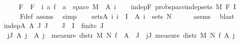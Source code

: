 \begin{isabellebody}
%
\isadelimproof
%
\endisadelimproof
%
\isatagproof
{}\isamarkupfalse%
\ {\isacharminus}{\kern0pt}\isanewline
\ \ \isamarkupfalse%
\ F\ \ {\isachardoublequoteopen}F\ {\isacharequal}{\kern0pt}\ {\isacharparenleft}{\kern0pt}{\isasymlambda}i{\isachardot}{\kern0pt}\ {\isacharparenleft}{\kern0pt}{\isasymlambda}a{\isachardot}{\kern0pt}\ f\ {\isacharminus}{\kern0pt}{\isacharbackquote}{\kern0pt}\ a\ {\isasyminter}\ space\ M{\isacharparenright}{\kern0pt}\ {\isacharbackquote}{\kern0pt}\ A\ i{\isacharparenright}{\kern0pt}{\isachardoublequoteclose}\isanewline
\ \ \isamarkupfalse%
\ indep{\isacharunderscore}{\kern0pt}F{\isacharcolon}{\kern0pt}\ {\isachardoublequoteopen}prob{\isacharunderscore}{\kern0pt}space{\isachardot}{\kern0pt}indep{\isacharunderscore}{\kern0pt}sets\ M\ F\ I{\isachardoublequoteclose}\isanewline
\ \ \ \ \isamarkupfalse%
\ F{\isacharunderscore}{\kern0pt}def\ assms{\isacharparenleft}{\kern0pt}{}{\isacharparenright}{\kern0pt}\ \isamarkupfalse%
\ simp\isanewline
\isanewline
\ \ \isamarkupfalse%
\ sets{\isacharunderscore}{\kern0pt}A{\isacharcolon}{\kern0pt}\ {\isachardoublequoteopen}{\isasymAnd}i{\isachardot}{\kern0pt}\ i\ {\isasymin}\ I\ {\isasymLongrightarrow}\ A\ i\ {\isasymsubseteq}\ sets\ N{\isachardoublequoteclose}\isanewline
\ \ \ \ \isamarkupfalse%
\ assms{\isacharparenleft}{\kern0pt}{}{\isacharparenright}{\kern0pt}\ \isamarkupfalse%
\ blast\isanewline
\isanewline
\ \ \isamarkupfalse%
\ indep{\isacharunderscore}{\kern0pt}A{\isacharcolon}{\kern0pt}\ {\isachardoublequoteopen}{\isasymAnd}A{\isacharprime}{\kern0pt}\ J{\isachardot}{\kern0pt}\ J\ {\isasymnoteq}\ {\isacharbraceleft}{\kern0pt}{\isacharbraceright}{\kern0pt}\ {\isasymLongrightarrow}\ J\ {\isasymsubseteq}\ I\ {\isasymLongrightarrow}\ finite\ J\ {\isasymLongrightarrow}\ \isanewline
\ \ {\isasymforall}j{\isasymin}J{\isachardot}{\kern0pt}\ A{\isacharprime}{\kern0pt}\ j\ {\isasymin}\ A\ j\ {\isasymLongrightarrow}\ measure\ {\isacharparenleft}{\kern0pt}distr\ M\ N\ f{\isacharparenright}{\kern0pt}\ {\isacharparenleft}{\kern0pt}{\isasymInter}\ {\isacharparenleft}{\kern0pt}A{\isacharprime}{\kern0pt}\ {\isacharbackquote}{\kern0pt}\ J{\isacharparenright}{\kern0pt}{\isacharparenright}{\kern0pt}\ {\isacharequal}{\kern0pt}\ {\isacharparenleft}{\kern0pt}{\isasymProd}j{\isasymin}J{\isachardot}{\kern0pt}\ measure\ {\isacharparenleft}{\kern0pt}distr\ M\ N\ f{\isacharparenright}{\kern0pt}\ {\isacharparenleft}{\kern0pt}A{\isacharprime}{\kern0pt}\ j{\isacharparenright}{\kern0pt}{\isacharparenright}{\kern0pt}{\isachardoublequoteclose}\isanewline

\end{isabellebody}
